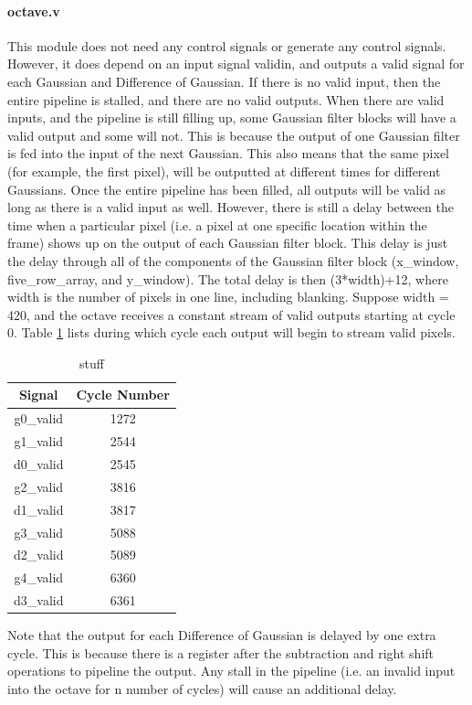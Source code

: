\paragraph{octave.v}
This module does not need any control signals or generate any control signals. 
However, it does depend on an input signal validin, and outputs a valid signal 
for each Gaussian and Difference of Gaussian. If there is no valid input, then 
the entire pipeline is stalled, and there are no valid outputs. When there are 
valid inputs, and the pipeline is still filling up, some Gaussian filter blocks 
will have a valid output and some will not. This is because the output of one 
Gaussian filter is fed into the input of the next Gaussian. This also means that 
the same pixel (for example, the first pixel), will be outputted at different 
times for different Gaussians. Once the entire pipeline has been filled, all 
outputs will be valid as long as there is a valid input as well. However, there 
is still a delay between the time when a particular pixel (i.e. a pixel at one 
specific location within the frame) shows up on the output of each Gaussian 
filter block. This delay is just the delay through all of the components of the 
Gaussian filter block (x\_window, five\_row\_array, and y\_window). The total delay 
is then (3*width)+12, where width is the number of pixels in one line, including 
blanking. Suppose width = 420, and the octave receives a constant stream of 
valid outputs starting at cycle 0. Table \ref{wrap-tab:valids} lists during which cycle each
output will begin to stream valid pixels.

\begin{table}
\begin{tabular}{c | c} \toprule
 Signal & Cycle Number \\\toprule
 g0\_valid & 1272 \\
 g1\_valid & 2544 \\
 d0\_valid & 2545 \\
 g2\_valid & 3816 \\
 d1\_valid & 3817 \\
 g3\_valid & 5088 \\
 d2\_valid & 5089 \\
 g4\_valid & 6360 \\
 d3\_valid & 6361 \\
\end{tabular}
\caption{ stuff }\label{wrap-tab:valids}
\end{table}

Note that the output for each Difference of Gaussian is delayed by one extra cycle. This is because there is a register after the subtraction and right shift operations to pipeline the output. Any stall in the pipeline (i.e. an invalid input into the octave for n number of cycles) will cause an additional delay.

